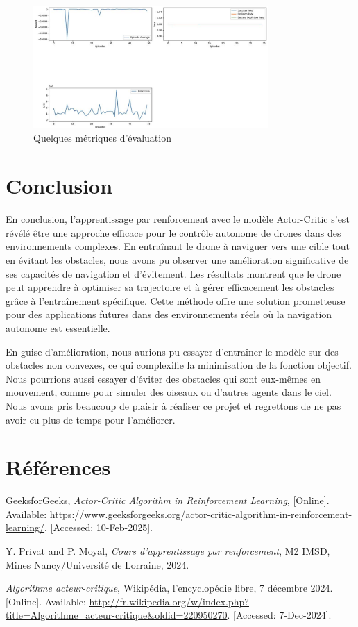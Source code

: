 \documentclass[a4paper, 12pt]{article}
\begin{document}
\begin{figure}[H]
    \centering
    \includegraphics[width=0.8\textwidth]{metrics.png}
    \caption{Quelques métriques d'évaluation}
\end{figure}

\section{Conclusion}

En conclusion, l'apprentissage par renforcement avec le modèle Actor-Critic s'est révélé être une approche efficace pour le contrôle autonome de drones dans des environnements complexes. En entraînant le drone à naviguer vers une cible tout en évitant les obstacles, nous avons pu observer une amélioration significative de ses capacités de navigation et d'évitement. Les résultats montrent que le drone peut apprendre à optimiser sa trajectoire et à gérer efficacement les obstacles grâce à l'entraînement spécifique. Cette méthode offre une solution prometteuse pour des applications futures dans des environnements réels où la navigation autonome est essentielle.

En guise d'amélioration, nous aurions pu essayer d'entraîner le modèle sur des obstacles non convexes, ce qui complexifie la minimisation de la fonction objectif. Nous pourrions aussi essayer d'éviter des obstacles qui sont eux-mêmes en mouvement, comme pour simuler des oiseaux ou d'autres agents dans le ciel. Nous avons pris beaucoup de plaisir à réaliser ce projet et regrettons de ne pas avoir eu plus de temps pour l'améliorer.

\section{Références}

\begin{thebibliography}{9}

GeeksforGeeks, \textit{Actor-Critic Algorithm in Reinforcement Learning}, [Online]. Available: \url{https://www.geeksforgeeks.org/actor-critic-algorithm-in-reinforcement-learning/}. [Accessed: 10-Feb-2025].

Y. Privat and P. Moyal, \textit{Cours d'apprentissage par renforcement}, M2 IMSD, Mines Nancy/Université de Lorraine, 2024.

\textit{Algorithme acteur-critique}, Wikipédia, l'encyclopédie libre, 7 décembre 2024. [Online]. Available: \url{http://fr.wikipedia.org/w/index.php?title=Algorithme_acteur-critique&oldid=220950270}. [Accessed: 7-Dec-2024].

\end{thebibliography}
\end{document}
